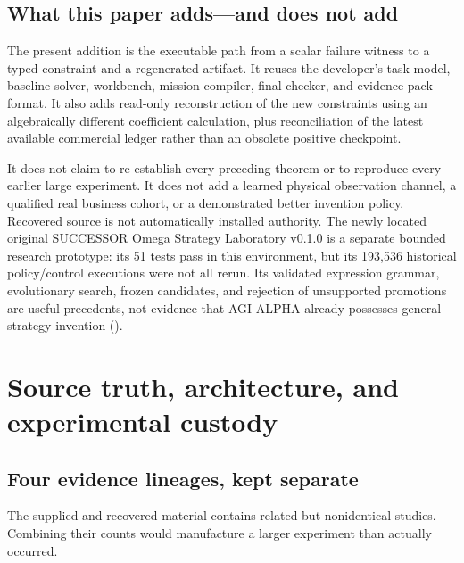 \subsection{What this paper adds---and does not
add}\label{what-this-paper-addsand-does-not-add}

The present addition is the executable path from a scalar failure
witness to a typed constraint and a regenerated artifact. It reuses the
developer's task model, baseline solver, workbench, mission compiler,
final checker, and evidence-pack format. It also adds read-only
reconstruction of the new constraints using an algebraically different
coefficient calculation, plus reconciliation of the latest available
commercial ledger rather than an obsolete positive checkpoint.

It does not claim to re-establish every preceding theorem or to
reproduce every earlier large experiment. It does not add a learned
physical observation channel, a qualified real business cohort, or a
demonstrated better invention policy. Recovered source is not
automatically installed authority. The newly located original SUCCESSOR
Omega Strategy Laboratory v0.1.0 is a separate bounded research
prototype: its 51 tests pass in this environment, but its 193,536
historical policy/control executions were not all rerun. Its validated
expression grammar, evolutionary search, frozen candidates, and
rejection of unsupported promotions are useful precedents, not evidence
that AGI ALPHA already possesses general strategy invention
().

\section{Source truth, architecture, and experimental
custody}\label{custody}

\subsection{Four evidence lineages, kept
separate}\label{four-evidence-lineages-kept-separate}

The supplied and recovered material contains related but nonidentical
studies. Combining their counts would manufacture a larger experiment
than actually occurred.

